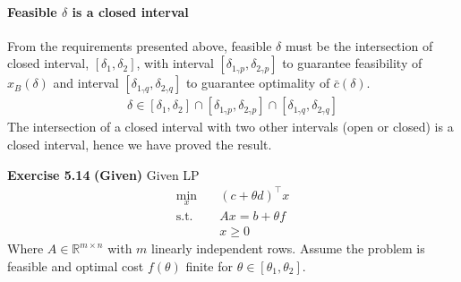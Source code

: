 \documentclass[11pt]{exam}
\begin{document}
\begin{questions}
    \paragraph{Feasible $\delta$ is a closed interval}
    From the requirements presented above, feasible $\delta$ must be the intersection of closed interval, $[\delta_1, \delta_2]$, with interval $[\delta_{1_\gamma p}, \delta_{2_\gamma p}]$ to guarantee feasibility of $x_B(\delta)$ and interval $[\delta_{1_\gamma q}, \delta_{2_\gamma q}]$ to guarantee optimality of $\bar c(\delta)$. 
    \begin{align*}
      \delta \in [\delta_1, \delta_2]\cap [\delta_{1_\gamma p}, \delta_{2_\gamma p}] \cap [\delta_{1_\gamma q}, \delta_{2_\gamma q}]
    \end{align*}
    The intersection of a closed interval with two other intervals (open or closed) is a closed interval, hence we have proved the result.    



    \question \textbf{Exercise 5.14}
    \newline\textbf{(Given)} Given LP 
    \begin{align*}
      \min_x \quad& (c + \theta d)^\top x\\
      \text{s.t.}\quad & Ax = b + \theta f\\
      & x\geq 0
    \end{align*}
    Where $A\in \mathbb R^{m\times n}$ with $m$ linearly independent rows. Assume the problem is feasible and optimal cost $f(\theta)$ finite for $\theta \in [\theta_1, \theta_2]$. 
\end{questions}
\end{document}
